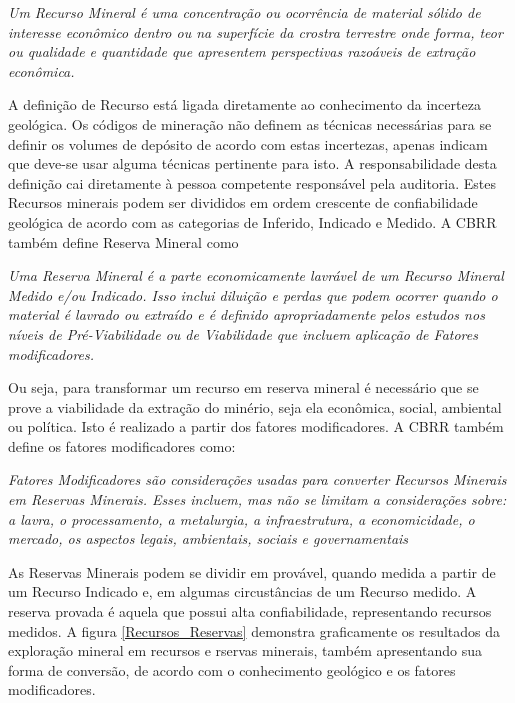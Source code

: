 \begin{definition}
	\textit{Um Recurso Mineral é uma concentração ou ocorrência de material sólido de interesse econômico dentro ou na superfície da crostra terrestre onde forma, teor ou qualidade e quantidade que apresentem perspectivas razoáveis de extração econômica.} 
\end{definition}

A definição de Recurso está ligada diretamente ao conhecimento da incerteza geológica. Os códigos de mineração não definem as técnicas necessárias para se definir os volumes de depósito de acordo com estas incertezas, apenas indicam que deve-se usar alguma técnicas pertinente para isto. A responsabilidade desta definição cai diretamente à pessoa competente responsável pela auditoria. Estes Recursos minerais podem ser divididos em ordem crescente de confiabilidade geológica de acordo com as categorias de Inferido, Indicado e Medido. A CBRR também define Reserva Mineral como

\begin{definition}
	\textit{Uma Reserva Mineral é a parte economicamente lavrável de um Recurso Mineral Medido e/ou Indicado. Isso inclui diluição e perdas que podem ocorrer quando o material é lavrado ou extraído e é definido apropriadamente pelos estudos nos níveis de Pré-Viabilidade ou de Viabilidade que incluem aplicação de Fatores modificadores.} 
\end{definition}

Ou seja, para transformar um recurso em reserva mineral é necessário que se prove a viabilidade da extração do minério, seja ela econômica, social, ambiental ou política. Isto é realizado a partir dos fatores modificadores.  A CBRR também define os fatores modificadores como: 


\begin{definition}
	\textit{Fatores Modificadores são considerações usadas para converter Recursos Minerais em Reservas Minerais. Esses incluem, mas não se limitam a considerações sobre:  a lavra, o processamento, a metalurgia, a infraestrutura, a economicidade, o mercado, os aspectos legais, ambientais, sociais e governamentais} 
\end{definition}

As Reservas Minerais podem se dividir em provável, quando medida a partir de um Recurso Indicado e, em algumas circustâncias de um Recurso medido. A reserva provada é aquela que possui alta confiabilidade, representando recursos medidos. A figura \ref{Recursos_Reservas} demonstra graficamente os resultados da exploração mineral em recursos e rservas minerais, também apresentando sua forma de conversão, de acordo com o conhecimento geológico e os fatores modificadores.

